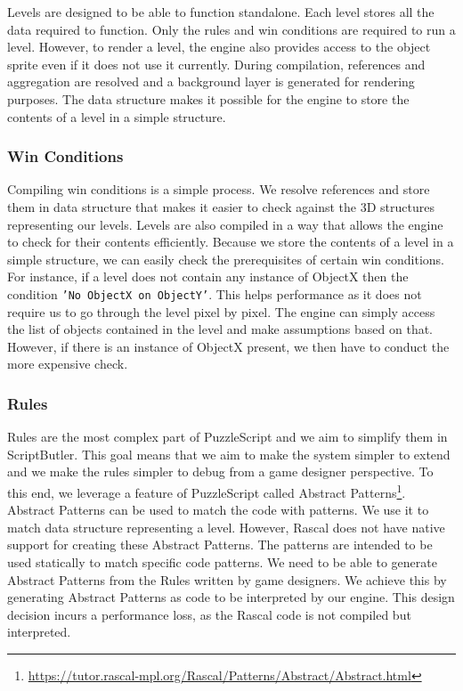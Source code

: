 Levels are designed to be able to function standalone. Each level stores all the data required to function. Only the rules and win conditions are required to run a level. However, to render a level, the engine also provides access to the object sprite even if it does not use it currently. During compilation, references and aggregation are resolved and a background layer is generated for rendering purposes. The data structure makes it possible for the engine to store the contents of a level in a simple structure.

\subsubsection{Win Conditions}
Compiling win conditions is a simple process. We resolve references and store them in data structure that makes it easier to check against the 3D structures representing our levels. Levels are also compiled in a way that allows the engine to check for their contents efficiently. Because we store the contents of a level in a simple structure, we can easily check the prerequisites of certain win conditions. For instance, if a level does not contain any instance of ObjectX then the condition \texttt{'No ObjectX on ObjectY'}. This helps performance as it does not require us to go through the level pixel by pixel. The engine can simply access the list of objects contained in the level and make assumptions based on that. However, if there is an instance of ObjectX present, we then have to conduct the more expensive check.

\subsubsection{Rules}
Rules are the most complex part of PuzzleScript and we aim to simplify them in ScriptButler. This goal means that we aim to make the system simpler to extend and we make the rules simpler to debug from a game designer perspective. To this end, we leverage a feature of PuzzleScript called Abstract Patterns\footnote{\url{https://tutor.rascal-mpl.org/Rascal/Patterns/Abstract/Abstract.html}}\dd. Abstract Patterns can be used to match the code with patterns. We use it to match data structure representing a level. However, Rascal does not have native support for creating these Abstract Patterns. The patterns are intended to be used statically to match specific code patterns. We need to be able to generate Abstract Patterns from the Rules written by game designers. We achieve this by generating Abstract Patterns as code to be interpreted by our engine\dd. This design decision incurs a performance loss, as the Rascal code is not compiled but interpreted.

